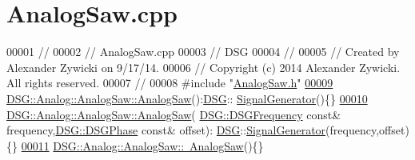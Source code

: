 \hypertarget{_analog_saw_8cpp_source}{\section{Analog\+Saw.\+cpp}
\label{_analog_saw_8cpp_source}
}

\begin{DoxyCode}
00001 \textcolor{comment}{//}
00002 \textcolor{comment}{//  AnalogSaw.cpp}
00003 \textcolor{comment}{//  DSG}
00004 \textcolor{comment}{//}
00005 \textcolor{comment}{//  Created by Alexander Zywicki on 9/17/14.}
00006 \textcolor{comment}{//  Copyright (c) 2014 Alexander Zywicki. All rights reserved.}
00007 \textcolor{comment}{//}
00008 \textcolor{preprocessor}{#include "\hyperlink{_analog_saw_8h}{AnalogSaw.h}"}
\hypertarget{_analog_saw_8cpp_source_l00009}{}\hyperlink{class_d_s_g_1_1_analog_1_1_analog_saw_abcb0b997be32413da0d14b93aeeb9c17}{00009} \hyperlink{class_d_s_g_1_1_analog_1_1_analog_saw_abcb0b997be32413da0d14b93aeeb9c17}{DSG::Analog::AnalogSaw::AnalogSaw}():\hyperlink{namespace_d_s_g}{DSG}::
      \hyperlink{class_d_s_g_1_1_signal_generator}{SignalGenerator}()\{\}
\hypertarget{_analog_saw_8cpp_source_l00010}{}\hyperlink{class_d_s_g_1_1_analog_1_1_analog_saw_ad110da0b337948fb70ecdfad7dbb5ddf}{00010} \hyperlink{class_d_s_g_1_1_analog_1_1_analog_saw_abcb0b997be32413da0d14b93aeeb9c17}{DSG::Analog::AnalogSaw::AnalogSaw}(
      \hyperlink{namespace_d_s_g_a4315a061386fa1014fda09b15d3a6973}{DSG::DSGFrequency} \textcolor{keyword}{const}& frequency,\hyperlink{namespace_d_s_g_a44431ce1eb0a7300efdd207bc879e52c}{DSG::DSGPhase} \textcolor{keyword}{const}& offset):
      \hyperlink{namespace_d_s_g}{DSG}::\hyperlink{class_d_s_g_1_1_signal_generator}{SignalGenerator}(frequency,offset)\{\}
\hypertarget{_analog_saw_8cpp_source_l00011}{}\hyperlink{class_d_s_g_1_1_analog_1_1_analog_saw_a42a5fe22e0c3b9d1bd3996fe5bbd24ba}{00011} \hyperlink{class_d_s_g_1_1_analog_1_1_analog_saw_a42a5fe22e0c3b9d1bd3996fe5bbd24ba}{DSG::Analog::AnalogSaw::~AnalogSaw}()\{\}
\end{DoxyCode}

